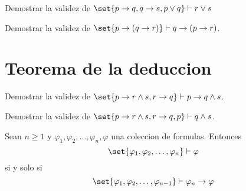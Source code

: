 \begin{example}
	Demostrar la validez de \(\set{p \rightarrow q, q \rightarrow s, p \vee  q} \vdash r \vee s\)

\end{example}
\begin{example}
	Demostrar la validez de \(\set{p \rightarrow (q \rightarrow r)} \vdash q \rightarrow (p \rightarrow r )\).
\end{example}

\section{Teorema de la deduccion}
\begin{example}
	Demostrar la validez de \(\set{p \rightarrow r \wedge  s, r \rightarrow q} \vdash p \rightarrow q \wedge  s \).
\end{example}
\begin{example}
	Demostrar la validez de \(\set{p \rightarrow r \wedge  s, r \rightarrow q,p} \vdash q \wedge  s \).
\end{example}
\begin{theorem}[de la deduccion]
	Sean \(n \geq  1 \) y \(\varphi_1, \varphi_2, \ldots, \varphi_n, \varphi\) una coleccion de formulas. Entonces
	\[
		\set{\varphi_1, \varphi_2, \ldots, \varphi_n} \vdash \varphi
	\]
	si y solo si
	\[
		\set{\varphi_1, \varphi_2, \ldots, \varphi_{n-1}} \vdash \varphi_n \rightarrow \varphi
	\]
\end{theorem}
